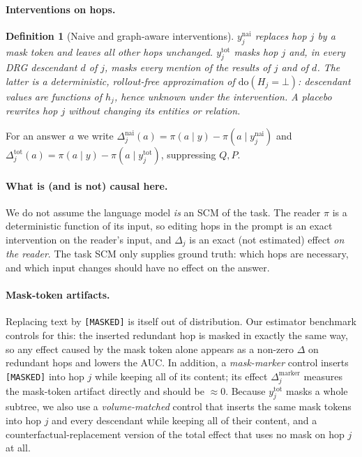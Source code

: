 \documentclass[11pt]{article}
\newtheorem{definition}{Definition}
\newcommand{\pa}{\pi}
\newcommand{\dotot}[1]{y^{\mathrm{tot}}_{#1}}
\newcommand{\donai}[1]{y^{\mathrm{nai}}_{#1}}
\begin{document}
\paragraph{Interventions on hops.}
\begin{definition}[Naive and graph-aware interventions]
$\donai{j}$ replaces hop $j$ by a mask token and leaves all other hops unchanged.
$\dotot{j}$ masks hop $j$ and, in every DRG descendant $d$ of $j$, masks every mention of the
results of $j$ and of $d$. The latter is a deterministic, rollout-free approximation of
$\mathrm{do}(H_j{=}\bot)$: descendant values are functions of $h_j$, hence unknown under the
intervention. A \emph{placebo} rewrites hop $j$ without changing its entities or relation.
\end{definition}
For an answer $a$ we write $\Delta^{\mathrm{nai}}_j(a)=\pa(a\mid y)-\pa(a\mid\donai{j})$ and
$\Delta^{\mathrm{tot}}_j(a)=\pa(a\mid y)-\pa(a\mid\dotot{j})$, suppressing $Q,P$.

\paragraph{What is (and is not) causal here.} We do not assume the language model \emph{is} an SCM
of the task. The reader $\pa$ is a deterministic function of its input, so editing hops in the
prompt is an exact intervention on the reader's input, and $\Delta_j$ is an exact (not estimated)
effect \emph{on the reader}. The task SCM only supplies ground truth: which hops are necessary,
and which input changes should have no effect on the answer.

\paragraph{Mask-token artifacts.} Replacing text by \texttt{[MASKED]} is itself out of
distribution. Our estimator benchmark controls for this: the inserted redundant hop is masked in
exactly the same way, so any effect caused by the mask token alone appears as a non-zero
$\Delta$ on redundant hops and lowers the AUC. In addition, a \emph{mask-marker} control inserts
\texttt{[MASKED]} into hop $j$ while keeping all of its content; its effect
$\Delta^{\mathrm{marker}}_j$ measures the mask-token artifact directly and should be $\approx0$.
Because $\dotot{j}$ masks a whole subtree, we also use a \emph{volume-matched} control that inserts
the same mask tokens into hop $j$ and every descendant while keeping all of their content, and a
counterfactual-replacement version of the total effect that uses no mask on hop $j$ at all.
\end{document}
